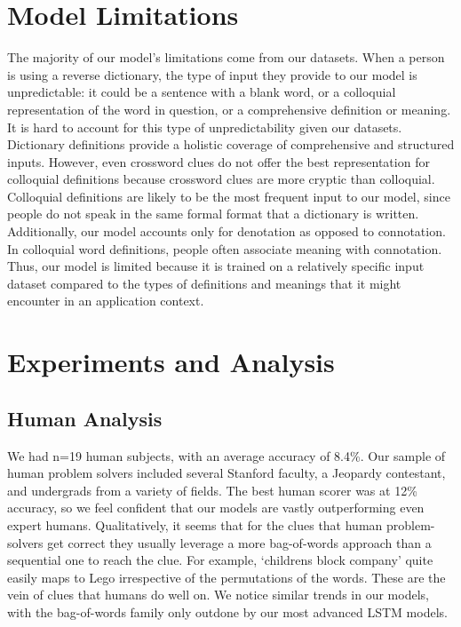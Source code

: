 \documentclass{article} %
\begin{document}
\section{Model Limitations}
The majority of our model’s limitations come from our datasets. When a person is using a reverse dictionary, the type of input they provide to our model is unpredictable: it could be a sentence with a blank word, or a colloquial representation of the word in question, or a comprehensive definition or meaning. It is hard to account for this type of unpredictability given our datasets. Dictionary definitions provide a holistic coverage of comprehensive and structured inputs. However, even crossword clues do not offer the best representation for colloquial definitions because crossword clues are more cryptic than colloquial. 
Colloquial definitions are likely to be the most frequent input to our model, since people do not speak in the same formal format that a dictionary is written. Additionally, our model accounts only for denotation as opposed to connotation. In colloquial word definitions, people often associate meaning with connotation. Thus, our model is limited because it is trained on a relatively specific input dataset compared to the types of definitions and meanings that it might encounter in an application context.

\section{Experiments and Analysis}

\subsection{Human Analysis}
We had n=19 human subjects, with an average accuracy of 8.4\%. Our sample of human problem solvers included several Stanford faculty, a Jeopardy contestant, and undergrads from a variety of fields. The best human scorer was at 12\% accuracy, so we feel confident that our models are vastly outperforming even expert humans.
Qualitatively, it seems that for the clues that human problem-solvers get correct they usually leverage a more bag-of-words approach than a sequential one to reach the clue. For example, ‘childrens block company’ quite easily maps to Lego irrespective of the permutations of the words. These are the vein of clues that humans do well on. We notice similar trends in our models, with the bag-of-words family only outdone by our most advanced LSTM models.
\end{document}
